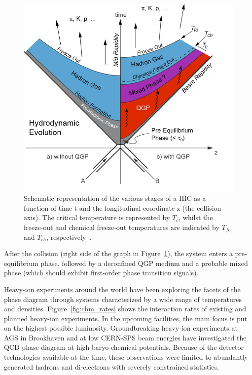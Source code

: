\begin{figure}[!h]
\centering
 \includegraphics[width=0.55\columnwidth]{Chapter1/images/heavyion.png}
\caption{Schematic representation of the various stages of a HIC as a function of time t and the longitudinal coordinate z (the collision axis). The critical temperature is represented by $T_c$, whilst the freeze-out and chemical freeze-out temperatures are indicated by $T_{fo}$ and $T_{ch}$, respectively~\cite{Sahoo:2745520}.}
\label{fig_heavyion}
\end{figure}
\newpage
 After the collision (right side of the graph in Figure~\ref{fig_heavyion}), the system enters a pre-equilibrium phase, followed by a deconfined QGP medium and a probable mixed phase (which should exhibit first-order phase transition signals).

Heavy-ion experiments around the world have been exploring the facets of the phase diagram through systems characterized by a wide range of temperatures and densities. Figure~\ref{fig:cbm_rates} shows the interaction rates of existing and planned heavy-ion experiments. In the upcoming facilities, the main focus is put on the highest possible luminosity. Groundbreaking heavy-ion experiments at AGS in Brookhaven and at low CERN-SPS beam energies have investigated the QCD phase diagram at high baryo-chemical potentials. Because of the detector technologies available at the time, these observations were limited to abundantly generated hadrons and di-electrons with severely constrained statistics.

